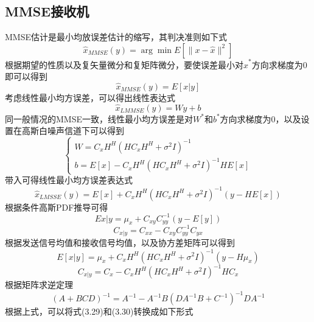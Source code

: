 \documentclass[bachelor,nocolorlinks, printoneside]{seuthesis} %
\begin{document}
\begin{Main}
\section{MMSE接收机}
MMSE估计是最小均放误差估计的缩写，其判决准则如下式
\begin{equation}\label{key}
\hat{x}_{MMSE}(y) = \arg \min E[\| x - \hat{x} \|^{2}]
\end{equation}
根据期望的性质以及复矢量微分和复矩阵微分，要使误差最小对$\hat{x}^{*}$方向求梯度为0即可以得到
\begin{equation}\label{key}
\hat{x}_{MMSE}(y) = E[x|y]
\end{equation}
考虑线性最小均方误差，可以得出线性表达式
\begin{equation}\label{key}
\hat{x}_{LMMSE}(y)=Wy+b
\end{equation}
同一般情况的MMSE一致，线性最小均方误差是对$W^{*}$和$b^{*}$方向求梯度为0，以及设置在高斯白噪声信道下可以得到
\begin{equation}\label{key}
\left\{
\begin{array}{l}
W=C_{x}H^{H}(HC_{x}H^{H} + \sigma^{2}I)^{-1} \\
b=E[x] - C_{x}H^{H}(HC_{x}H^{H} + \sigma^{2}I)^{-1}HE[x]
\end{array}
\right.
\end{equation}
带入可得线性最小均方误差表达式
\begin{equation}\label{key}
\hat{x}_{LMSSE}(y)=E[x]+C_{x}H^{H}(HC_{x}H^{H}+\sigma^{2}I)^{-1}(y-HE[x])
\end{equation}
根据条件高斯PDF推导可得
\begin{equation}\label{key}
E{x|y}=\mu_{x}+C_{xy}C_{yy}^{-1}(y-E[y])
\end{equation}
\begin{equation}\label{key}
C_{x|y} = C_{xx} -C_{xy}C_{yy}^{-1}C_{yx}
\end{equation}
根据发送信号均值和接收信号均值，以及协方差矩阵可以得到
\begin{equation}\label{key}
E[x|y]=\mu_{x} + C_{x}H^{H}(HC_{x}H^{H}+\sigma^{2}I)^{-1}(y-H\mu_{x})
\end{equation}
\begin{equation}\label{key}
C_{x|y}=C_{x}-C_{x}H^{H}(HC_{x}H^{H}+\sigma^{2}I)^{-1}HC_{x}
\end{equation}
根据矩阵求逆定理
\begin{equation}\label{key}
(A + BCD)^{-1} = A^{-1} - A^{-1}B(DA^{-1}B+C^{-1})^{-1}DA^{-1}
\end{equation}
根据上式，可以将式(3.29)和(3.30)转换成如下形式

\end{Main}
\end{document}
